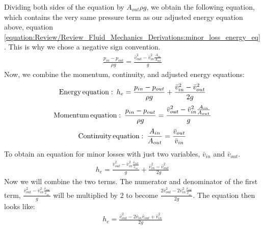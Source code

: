 \documentclass[letterpaper,10pt,english]{sphinxmanual}
\begin{document}
Dividing both sides of the equation by \(A_{out} \rho g\), we obtain the following equation, which contains the very same pressure term as our adjusted energy equation above, equation \eqref{equation:Review/Review_Fluid_Mechanics_Derivations:minor_loss_energy_eq}. This is why we chose a negative sign convention.
\begin{equation}\label{equation:Review/Review_Fluid_Mechanics_Derivations:Review/Review_Fluid_Mechanics_Derivations:6}
\begin{split}\frac{p_{in} - p_{out}}{\rho g} = \frac{\bar v_{out}^2 - \bar v_{in}^2 \frac{A_{in}}{A_{out}}}{g}\end{split}
\end{equation}
Now, we combine the momentum, continuity, and adjusted energy equations:
\begin{equation}\label{equation:Review/Review_Fluid_Mechanics_Derivations:Review/Review_Fluid_Mechanics_Derivations:7}
\begin{split}{\rm{Energy \, equation:}} \,\,\,  h_e = \frac{p_{in} - p_{out}}{\rho g} + \frac{\bar v_{in}^2 - \bar v_{out}^2}{2g}\end{split}
\end{equation}\begin{equation}\label{equation:Review/Review_Fluid_Mechanics_Derivations:Review/Review_Fluid_Mechanics_Derivations:8}
\begin{split}{\rm{Momentum \, equation:}} \,\,\, \frac{p_{in} - p_{out}}{\rho g} = \frac{\bar v_{out}^2 - \bar v_{in}^2 \frac{A_{in}}{A_{out}}}{g}\end{split}
\end{equation}\begin{equation}\label{equation:Review/Review_Fluid_Mechanics_Derivations:Review/Review_Fluid_Mechanics_Derivations:9}
\begin{split}{\rm{Continuity \, equation:}} \,\,\, \frac{A_{in}}{A_{out}} = \frac{\bar v_{out}}{\bar v_{in}}\end{split}
\end{equation}
To obtain an equation for minor losses with just two variables, \(\bar v_{in}\) and \(\bar v_{out}\).
\begin{equation}\label{equation:Review/Review_Fluid_Mechanics_Derivations:Review/Review_Fluid_Mechanics_Derivations:10}
\begin{split}h_e = \frac{\bar v_{out}^2 - \bar v_{in}^2\frac{\bar v_{out}}{\bar v_{in}}}{g} + \frac{\bar v_{in}^2 - \bar v_{out}^2}{2g}\end{split}
\end{equation}
Now we will combine the two terms. The numerator and denominator of the first term, \(\frac{\bar v_{out}^2 - \bar v_{in}^2\frac{\bar v_{out}}{\bar v_{in}}}{g}\) will be multiplied by \(2\) to become \(\frac{2 \bar v_{out}^2 - 2 \bar v_{in}^2\frac{\bar v_{out}}{\bar v_{in}}}{2 g}\). The equation then looks like:
\begin{equation}\label{equation:Review/Review_Fluid_Mechanics_Derivations:Review/Review_Fluid_Mechanics_Derivations:11}
\begin{split}h_e = \frac{\bar v_{out}^2 - 2 \bar v_{in} \bar v_{out} + \bar v_{in}^2}{2g}\end{split}
\end{equation}
\end{document}

